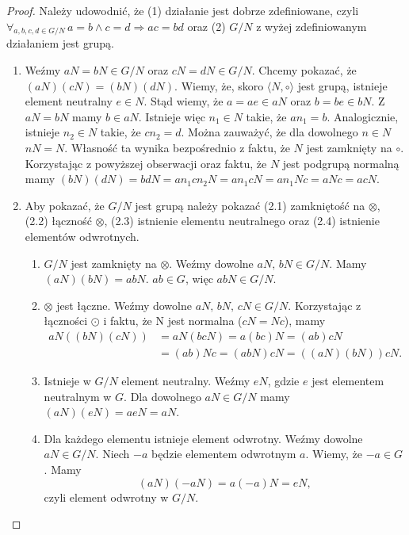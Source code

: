 \documentclass[declaration,shortabstract]{iithesis}
\theoremstyle{definition}
\theoremstyle{remark} \newtheorem{observation}{Obserwacja}
\theoremstyle{plain} \newtheorem{theorem}{Twierdzenie}
\theoremstyle{plain} \newtheorem{lemma}{Lemat}
\theoremstyle{remark} \newtheorem*{remark*}{Uwaga}
\theoremstyle{reminder} \newtheorem*{reminder*}{Przypomnienie}
\begin{document}
\begin{proof}
	Należy udowodnić, że (1) działanie jest dobrze zdefiniowane, czyli $\forall_{a, b, c, d \in G/N} \, a = b \wedge c = d \Rightarrow ac = bd$ oraz (2) $G/N$ z wyżej zdefiniowanym działaniem jest grupą.\newline
	\begin{enumerate}[label={(\arabic*)}, leftmargin=.4in]
		\item Weźmy $aN = bN \in G/N$ oraz $cN = dN \in G/N$. Chcemy pokazać, że $(aN)(cN) = (bN)(dN)$. Wiemy, że, skoro $\langle N, \circ \rangle$ jest grupą, istnieje element neutralny $e \in N$. Stąd wiemy, że $a = ae \in aN$ oraz $b = be \in bN$. Z $aN = bN$ mamy $b \in aN$. Istnieje więc $n_1 \in N$ takie, że $an_1 = b$. Analogicznie, istnieje $n_2 \in N$ takie, że $cn_2 = d$.\newline
		      \newline
		      Można zauważyć, że dla dowolnego $n \in N$ $nN = N$. Własność ta wynika bezpośrednio z faktu, że $N$ jest zamknięty na $\circ$.\newline
		      \newline
		      Korzystając z powyższej obserwacji oraz faktu, że $N$ jest podgrupą normalną mamy $(bN)(dN) = bdN = an_1cn_2N = an_1cN = an_1Nc = aNc = acN$.\newline
		\item Aby pokazać, że $G/N$ jest grupą należy pokazać (2.1) zamkniętość na $\otimes$, (2.2) łączność $\otimes$, (2.3) istnienie elementu neutralnego oraz (2.4) istnienie elementów odwrotnych.
		      \begin{enumerate}[label=(2.\arabic*)]
		      	\item $G/N$ jest zamknięty na $\otimes$. Weźmy dowolne $aN, \, bN \in G/N$. Mamy $(aN)(bN) = abN$. $ab \in G$, więc $abN \in G/N$.
		      	\item $\otimes$ jest łączne. Weźmy dowolne $aN, \, bN, \, cN \in G/N$. Korzystając z łączności $\odot$ i faktu, że N jest normalna ($cN = Nc$), mamy 
		      	      \begin{align}
		      	      	aN((bN)(cN)) & = aN(bcN) = a(bc)N = (ab)cN        \\
		      	      	             & = (ab)Nc = (abN)cN = ((aN)(bN))cN. 
		      	      \end{align}
		      	\item Istnieje w $G/N$ element neutralny. Weźmy $eN$, gdzie $e$ jest elementem neutralnym w $G$. Dla dowolnego $aN \in G/N$ mamy $(aN)(eN) = aeN = aN$.
		      	\item Dla każdego elementu istnieje element odwrotny. Weźmy dowolne $aN \in G/N$. Niech $-a$ będzie elementem odwrotnym $a$. Wiemy, że $-a \in G$. Mamy \[(aN)(-aN) = a(-a)N = eN,\] czyli element odwrotny w $G/N$.
		      \end{enumerate}
	\end{enumerate}
\end{proof}
\end{document}
